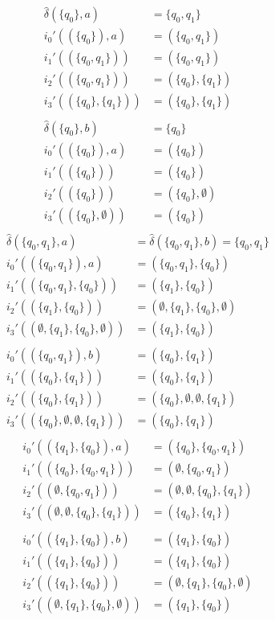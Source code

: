 \documentclass[a4paper,11pt]{report}
\begin{document}
\begin{align*}
  \hat{\delta}(\{q_0\},a) &= \{q_0,q_1\} \\
  i_0'((\{q_0\}),a) &= (\{q_0,q_1\}) \\
  i_1'((\{q_0,q_1\})) &= (\{q_0,q_1\})\\
  i_2'((\{q_0,q_1\})) &= (\{q_0\},\{q_1\})\\
  i_3'((\{q_0\},\{q_1\})) &= (\{q_0\},\{q_1\})\\
  \\
  \hat{\delta}(\{q_0\},b) &= \{q_0\} \\
  i_0'((\{q_0\}),a) &= (\{q_0\}) \\
  i_1'((\{q_0\})) &= (\{q_0\})\\
  i_2'((\{q_0\})) &= (\{q_0\},\emptyset)\\
  i_3'((\{q_0\},\emptyset)) &= (\{q_0\})\\
\end{align*}
\begin{align*}
  \hat\delta(\{q_0,q_1\},a) &=  \hat\delta(\{q_0,q_1\},b) = \{q_0,q_1\}\\
  i_0'((\{q_0,q_1\}),a) &= (\{q_0,q_1\},\{q_0\}) \\
  i_1'((\{q_0,q_1\},\{q_0\})) &= (\{q_1\},\{q_0\})\\
  i_2'((\{q_1\},\{q_0\})) &= (\emptyset,\{q_1\},\{q_0\},\emptyset)\\
  i_3'((\emptyset,\{q_1\},\{q_0\},\emptyset)) &= (\{q_1\},\{q_0\})\\
  \\
  i_0'((\{q_0,q_1\}),b) &= (\{q_0\},\{q_1\}) \\
  i_1'((\{q_0\},\{q_1\})) &= (\{q_0\},\{q_1\})\\
  i_2'((\{q_0\},\{q_1\})) &= (\{q_0\},\emptyset,\emptyset,\{q_1\})\\
  i_3'((\{q_0\},\emptyset,\emptyset,\{q_1\})) &= (\{q_0\},\{q_1\})\\
\end{align*}
\begin{align*}
  i_0'((\{q_1\},\{q_0\}),a) &= (\{q_0\},\{q_0,q_1\}) \\
  i_1'((\{q_0\},\{q_0,q_1\})) &= (\emptyset,\{q_0,q_1\}) \\
  i_2'((\emptyset,\{q_0,q_1\})) &= (\emptyset,\emptyset,\{q_0\},\{q_1\}) \\
  i_3'((\emptyset,\emptyset,\{q_0\},\{q_1\})) &= (\{q_0\},\{q_1\})\\
  \\
  i_0'((\{q_1\},\{q_0\}),b) &= (\{q_1\},\{q_0\}) \\
  i_1'((\{q_1\},\{q_0\})) &= (\{q_1\},\{q_0\}) \\
  i_2'((\{q_1\},\{q_0\})) &= (\emptyset,\{q_1\},\{q_0\},\emptyset) \\
  i_3'((\emptyset,\{q_1\},\{q_0\},\emptyset)) &= (\{q_1\},\{q_0\}) \\
\end{align*}
\end{document}
